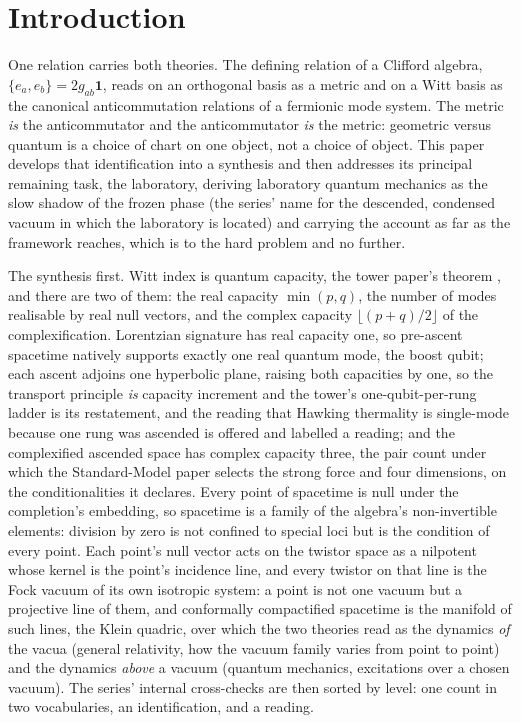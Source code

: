 \documentclass[11pt]{article}
\theoremstyle{definition}
\begin{document}
\newpage
\section{Introduction}\label{sec:intro}

One relation carries both theories. The defining relation of a Clifford algebra, $\{e_{a}, e_{b}\} = 2g_{ab}\mathbf{1}$, reads on an orthogonal basis as a metric and on a Witt basis as the canonical anticommutation relations of a fermionic mode system. The metric \emph{is} the anticommutator and the anticommutator \emph{is} the metric: geometric versus quantum is a choice of chart on one object, not a choice of object. This paper develops that identification into a synthesis and then addresses its principal remaining task, the laboratory, deriving laboratory quantum mechanics as the slow shadow of the frozen phase (the series' name for the descended, condensed vacuum in which the laboratory is located) and carrying the account as far as the framework reaches, which is to the hard problem and no further.

The synthesis first. Witt index is quantum capacity, the tower paper's theorem \cite[Thm.~4.3]{ButlerT3}, and there are two of them: the real capacity $\min(p,q)$, the number of modes realisable by real null vectors, and the complex capacity $\lfloor (p+q)/2 \rfloor$ of the complexification. Lorentzian signature has real capacity one, so pre-ascent spacetime natively supports exactly one real quantum mode, the boost qubit; each ascent adjoins one hyperbolic plane, raising both capacities by one, so the transport principle \emph{is} capacity increment and the tower's one-qubit-per-rung ladder is its restatement, and the reading that Hawking thermality is single-mode because one rung was ascended is offered and labelled a reading; and the complexified ascended space has complex capacity three, the pair count under which the Standard-Model paper selects the strong force and four dimensions, on the conditionalities it declares. Every point of spacetime is null under the completion's embedding, so spacetime is a family of the algebra's non-invertible elements: division by zero is not confined to special loci but is the condition of every point. Each point's null vector acts on the twistor space as a nilpotent whose kernel is the point's incidence line, and every twistor on that line is the Fock vacuum of its own isotropic system: a point is not one vacuum but a projective line of them, and conformally compactified spacetime is the manifold of such lines, the Klein quadric, over which the two theories read as the dynamics \emph{of} the vacua (general relativity, how the vacuum family varies from point to point) and the dynamics \emph{above} a vacuum (quantum mechanics, excitations over a chosen vacuum). The series' internal cross-checks are then sorted by level: one count in two vocabularies, an identification, and a reading.
\end{document}
